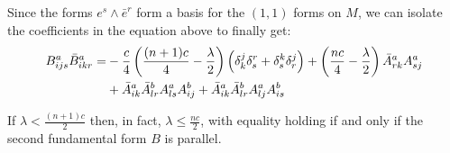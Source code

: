 %
Since the forms $e^s \wedge \bar{e}^r$ form a basis for the $(1,1)$ forms on $M$, we can isolate the coefficients in the equation above to finally get:
%
\begin{align}
B^a_{ijs} \bar{B}^a_{ikr} =& - \frac{c}{4} \left( \frac{(n+1)c}{4} - \frac{\lambda}{2} \right) \left( \delta^j_k \delta^r_s + \delta^k_s \delta^j_r \right) + \left( \frac{nc}{4} - \frac{\lambda}{2} \right)  \bar{A}^a_{rk} A^a_{sj}\\
&+ \bar{A}^a_{ik} \bar{A}^b_{lr} A^a_{ls} A^b_{ij} + \bar{A}^a_{ik} \bar{A}^b_{lr} A^a_{lj} A^b_{is}  \notag 
\end{align}

\begin{cor}  If $\lambda < \frac{(n+1)c}{2}$ then, in fact, $\lambda \leq \frac{nc}{2}$, with equality holding if and only if the second fundamental form $B$ is parallel.
\end{cor}
%
